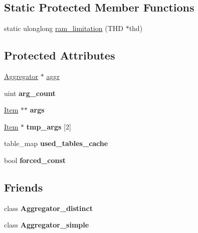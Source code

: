\subsection*{Static Protected Member Functions}
\begin{DoxyCompactItemize}
\item 
static ulonglong \mbox{\hyperlink{classItem__sum_ad70361f29a92bb55dccd236ddd5e9a53}{ram\+\_\+limitation}} (T\+HD $\ast$thd)
\end{DoxyCompactItemize}
\subsection*{Protected Attributes}
\begin{DoxyCompactItemize}
\item 
\mbox{\hyperlink{classAggregator}{Aggregator}} $\ast$ \mbox{\hyperlink{classItem__sum_a6ff5bd547facf5c328841cf385e59509}{aggr}}
\item 
\mbox{\label{classItem__sum_a1a7743356151cb7a567ff1a39078949f}} 
uint {\bfseries arg\+\_\+count}
\item 
\mbox{\label{classItem__sum_ae77718273b245bde4165dd5ecc201746}} 
\mbox{\hyperlink{classItem}{Item}} $\ast$$\ast$ {\bfseries args}
\item 
\mbox{\label{classItem__sum_abe612a6d8a11a53dd6783c6ccef29fe8}} 
\mbox{\hyperlink{classItem}{Item}} $\ast$ {\bfseries tmp\+\_\+args} \mbox{[}2\mbox{]}
\item 
\mbox{\label{classItem__sum_a058b0e6d479d59d533c2e790b8ae6c7d}} 
table\+\_\+map {\bfseries used\+\_\+tables\+\_\+cache}
\item 
\mbox{\label{classItem__sum_a67b53e7725198c9280538ca643c88e32}} 
bool {\bfseries forced\+\_\+const}
\end{DoxyCompactItemize}
\subsection*{Friends}
\begin{DoxyCompactItemize}
\item 
\mbox{\label{classItem__sum_a40fcb2830e29e49349d865893b6d0b7d}} 
class {\bfseries Aggregator\+\_\+distinct}
\item 
\mbox{\label{classItem__sum_aa25c05c6bfa3091d6d165dc8af5fecb8}} 
class {\bfseries Aggregator\+\_\+simple}
\end{DoxyCompactItemize}
